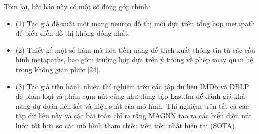 Tóm lại, bài báo này có một số đóng góp chính:
\begin{itemize}
  \item[] (1) Tác giả đề xuất một mạng neuron đồ thị mới dựa trên tổng hợp metapath để biểu diễn đồ thị không đồng nhất.
  \item[] (2) Thiết kế một số hàm mã hóa tiềm năng để trích xuất thông tin từ các cấu hình metapaths, bao gồm trường hợp dựa trên ý tưởng về phép xoay quan hệ trong không gian phức [24].
  \item[] (3) Tác giả tiến hành nhiều thí nghiệm trên các tập dữ liệu IMDb và DBLP để phân loại và phân cụm nút cũng như dùng tập Last.fm để đánh giá khả năng dự đoán liên kết và hiệu suất của mô hình. Thí nghiệm trên tất cả các tập dữ liệu này và các bài toán chỉ ra rằng MAGNN tạo ra các biểu diễn nút luôn tốt hơn so các mô hình tham chiếu tiên tiến nhất hiện tại (SOTA).
\end{itemize}


